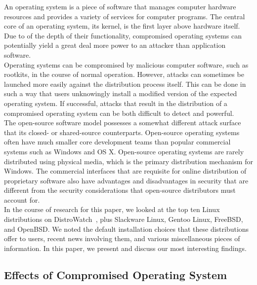\documentclass[conference]{IEEEtran}
\begin{document}
An operating system is a piece of software that manages computer hardware resources
and provides a variety of services for computer programs.
The central core of an operating system, its kernel, is the first layer
above hardware itself. Due to of the depth of their functionality,
compromised operating systems can potentially yield a great deal more power
to an attacker than application software.\\
\indent Operating systems can be compromised by malicious computer software,
such as rootkits, in the course of normal operation. However, attacks can sometimes
be launched more easily against the distribution process itself. This can be done in such a way
that users unknowingly install a modified version of the expected operating
system. If successful, attacks that result in the distribution of a compromised
operating system can be both difficult to detect and
powerful.\\
\indent The open-source software model possesses a somewhat different attack surface that its closed- or shared-source counterparts.
Open-source operating systems often have much smaller core development teams
than popular commercial systems such as Windows and OS X. Open-source operating systems are rarely distributed using
physical media, which is the primary distribution mechanism for Windows.
The commercial interfaces that are requisite for online distribution of proprietary
software also have advantages and disadvantages in security that
are different from the security considerations that open-source distributors must account for.\\
\indent In the course of research for this paper, we looked at the top ten Linux distributions
on DistroWatch~\cite{DistroWatch}, plus Slackware Linux, Gentoo Linux, FreeBSD, and OpenBSD.\@
We noted the default installation choices that these distributions offer to users, recent
news involving them, and various miscellaneous pieces of information. In this paper, we present
and discuss our most interesting findings.

\subsection{Effects of Compromised Operating System}
\end{document}
